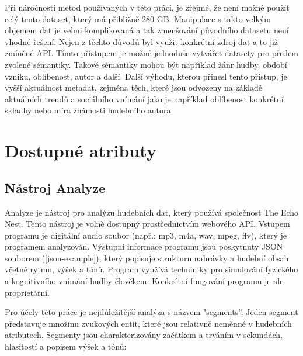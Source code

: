 \documentclass[thesis=M,czech]{FITthesis}[2012/06/26]
\begin{document}
	Při náročnosti metod používaných v této práci, je zřejmé, že není možné použít celý tento dataset, který má přibližně 280 GB. Manipulace s takto velkým objemem dat je velmi komplikovaná a tak zmenšování původního datasetu není vhodné řešení. Nejen z těchto důvodů byl využit konkrétní zdroj dat a to již zmíněné API. Tímto přístupem je možné jednoduše vytvářet datasety pro předem zvolené sémantiky. Takové sémantiky mohou být například žánr hudby, období vzniku, oblíbenost, autor a další. Další výhodu, kterou přinesl tento přístup, je vyšší aktuálnost metadat, zejména těch, které jsou odvozeny na základě aktuálních trendů a sociálního vnímání jako je například oblíbenost konkrétní skladby nebo míra známosti hudebního autora.
	
\section{Dostupné atributy}
\subsection{Nástroj Analyze}

Analyze je nástroj pro analýzu hudebních dat, který používá společnost The Echo Nest. 
Tento nástroj je volně dostupný prostřednictvím webového API. Vstupem programu je digitální audio soubor (např.:  mp3, m4a, wav, mpeg, flv), který je programem analyzován. Výstupní informace programu jsou poskytnuty JSON souborem (\ref{json-example}), který popisuje strukturu nahrávky a hudební obsah včetně rytmu, výšek a tónů. Program využívá techniniky pro simulování fyzického a kognitivního vnímání hudby člověkem. Konkrétní fungování programu je ale proprietární. 

 Pro účely této práce je nejdůležitější analýza s názvem "segments”. Jeden segment představuje množinu zvukových entit, které jsou relativně neměnné v hudebních atributech. Segmenty jsou charakterizovány začátkem a trváním v sekundách, hlasitostí a popisem výšek a tónů:
\end{document}

